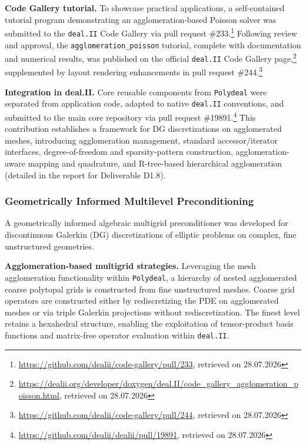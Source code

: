 \documentclass[a4paper,12pt, numbers]{article}
\newcommand{\dealii}{\texttt{deal.II}}
\begin{document}
\noindent\textbf{Code Gallery tutorial.}
To showcase practical applications, a self-contained tutorial program demonstrating an agglomeration-based Poisson solver was submitted to the \dealii{} Code Gallery via pull request \#233.\footnote{\url{https://github.com/dealii/code-gallery/pull/233}, retrieved on 28.07.2026} Following review and approval, the \texttt{agglomeration\_poisson} tutorial, complete with documentation and numerical results, was published on the official \dealii{} Code Gallery page,\footnote{\url{https://dealii.org/developer/doxygen/deal.II/code_gallery_agglomeration_poisson.html}, retrieved on 28.07.2026} supplemented by layout rendering enhancements in pull request \#244.\footnote{\url{https://github.com/dealii/code-gallery/pull/244}, retrieved on 28.07.2026}

\noindent\textbf{Integration in deal.II.}
Core reusable components from \texttt{Polydeal} were separated from application code, adapted to native \dealii{} conventions, and submitted to the main core repository via pull request \#19891.\footnote{\url{https://github.com/dealii/dealii/pull/19891}, retrieved on 28.07.2026} This contribution establishes a framework for DG discretizations on agglomerated meshes, introducing agglomeration management, standard accessor/iterator interfaces, degree-of-freedom and sparsity-pattern construction, agglomeration-aware mapping and quadrature, and R-tree-based hierarchical agglomeration (detailed in the report for Deliverable D1.8).

\subsubsection*{Geometrically Informed Multilevel Preconditioning}

\noindent A geometrically informed algebraic multigrid preconditioner was developed for discontinuous Galerkin (DG) discretizations of elliptic problems on complex, fine unstructured geometries.

\noindent\textbf{Agglomeration-based multigrid strategies.}
Leveraging the mesh agglomeration functionality within \texttt{Polydeal}, a hierarchy of nested agglomerated coarse polytopal grids is constructed from fine unstructured meshes. Coarse grid operators are constructed either by rediscretizing the PDE on agglomerated meshes or via triple Galerkin projections without rediscretization. The finest level retains a hexahedral structure, enabling the exploitation of tensor-product basis functions and matrix-free operator evaluation within \dealii{}.
\end{document}
